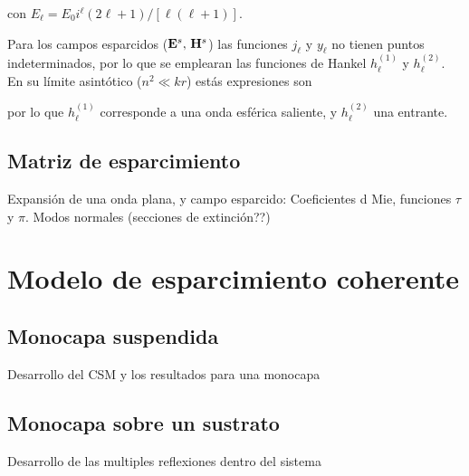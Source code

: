 \vspace*{-1em}\noindent
con $E_\ell =E _0 i^\ell (2\ell+1)/[\ell(\ell+1)]$.

Para los campos esparcidos ($\vb{E}^s,\,\vb{H}^s$) las funciones $j_\ell$ y $y_\ell$ no tienen puntos indeterminados, por lo que se emplearan las funciones de Hankel $h_\ell^{(1)}$ y $h_\ell^{(2)}$. En su límite asintótico ($n^2\ll kr$) estás expresiones son

\vspace*{-1em}\noindent
por lo que $h_\ell^(1)$ corresponde a una onda esférica saliente, y $h_\ell^(2)$ una entrante.



	
	\subsection*{Matriz de esparcimiento}
	Expansión de una onda plana, y campo esparcido: Coeficientes d Mie, funciones $\tau$ y $\pi$. Modos normales (secciones de extinción??)

\section{Modelo de esparcimiento coherente}
\blindtext
	 \subsection{Monocapa suspendida}
		Desarrollo del CSM y los resultados para una monocapa	 
	 \subsection{Monocapa sobre un sustrato}
	 	Desarrollo de las multiples reflexiones dentro del sistema
